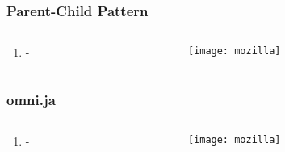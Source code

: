 \documentclass[
	notes=none,
	aspectratio=169
]{beamer}
\begin{document}

\begin{frame}
\frametitle{Parent-Child Pattern}

\begin{columns}[T]
\begin{column}[T]{0.5\textwidth}
\setlength{\parskip}{0.5em}

\vspace{1.5cm}
\begin{enumerate}
\setlength{\parskip}{0.5em}
\item -
\end{enumerate}

\end{column}
\begin{column}[T]{0.5\textwidth}
\setlength{\parskip}{0.5em}

\vspace{0.5cm}
\texttt{[image: mozilla]}

\end{column}
\end{columns}

\end{frame}
\note{
\begin{enumerate}
\item -
\end{enumerate}
}


\begin{frame}
\frametitle{omni.ja}

\begin{columns}[T]
\begin{column}[T]{0.5\textwidth}
\setlength{\parskip}{0.5em}

\vspace{1.5cm}
\begin{enumerate}
\setlength{\parskip}{0.5em}
\item -
\end{enumerate}

\end{column}
\begin{column}[T]{0.5\textwidth}
\setlength{\parskip}{0.5em}

\vspace{0.5cm}
\texttt{[image: mozilla]}

\end{column}
\end{columns}

\end{frame}
\note{
\begin{enumerate}
\item -
\end{enumerate}
}
\end{document}
